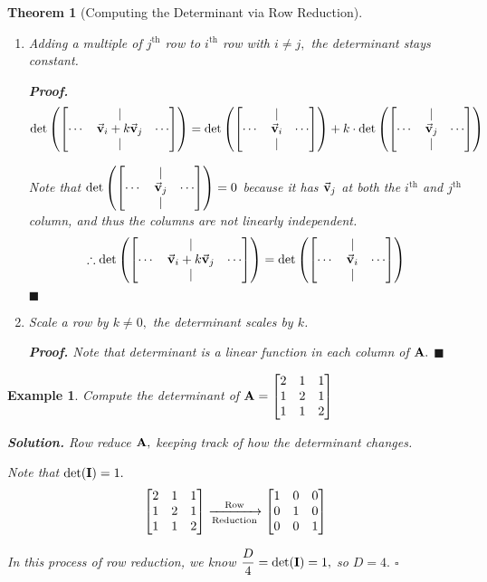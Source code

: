 \documentclass[12pt, a4paper]{article}
\newtheorem{thm}{Theorem}[subsection]
\newtheorem{eg}{Example}[subsection]
\newenvironment*{sol}{\par\indent\textbf{\textit{Solution. }}}{\hfill{$\square$}\par}
\newenvironment*{prf}{\par\indent\textbf{\textit{Proof. }}}{\hfill $\blacksquare$\par}
\def\vecv{\va{v}}
\def\matrixA{\vb{A}}
\def\matrixI{\vb{I}}
\begin{document}
\begin{thm}[Computing the Determinant via Row Reduction]
\begin{enumerate}
\begin{prf}
		\end{prf}
		\item Adding a multiple of $j^\text{th}$ row to $i^\text{th}$ row with $i\neq j,$ the determinant stays constant. 
		\begin{prf}
			\[\det\qty(\mqty[{&|&\\\cdots&\vecv_i+k\vecv_j&\cdots\\&|&}])=\det\qty(\mqty[{&|&\\\cdots&\vecv_i&\cdots\\&|&}])+k\cdot\det\qty(\mqty[{&|&\\\cdots&\vecv_j&\cdots\\&|&}])\]\par Note that $\det\qty(\mqty[{&|&\\\cdots&\vecv_j&\cdots\\&|&}])=0$ because it has $\vecv_j$ at both the $i^\text{th}$ and $j^\text{th}$ column, and thus the columns are not linearly independent. \[\therefore\det\qty(\mqty[{&|&\\\cdots&\vecv_i+k\vecv_j&\cdots\\&|&}])=\det\qty(\mqty[{&|&\\\cdots&\vecv_i&\cdots\\&|&}])\]
		\end{prf}
		\item Scale a row by $k\neq0,$ the determinant scales by $k$.
		\begin{prf}
			Note that determinant is a linear function in each column of $\matrixA.$
		\end{prf}
	\end{enumerate}
\end{thm}
\begin{eg}
	Compute the determinant of $\matrixA=\mqty[{2&1&1\\1&2&1\\1&1&2}]$
	\begin{sol}
		Row reduce $\matrixA,$ keeping track of how the determinant changes.\par  Note that $\det(\matrixI)=1.$	
		\[\mqty[{2&1&1\\1&2&1\\1&1&2}]\xrightarrow[\text{Reduction}]{\text{Row}}\mqty[{1&0&0\\0&1&0\\0&0&1}]\]\par In this process of row reduction, we know $\dfrac{D}{4}=\det(\matrixI)=1,$ so $D=4.$
	\end{sol}
\end{eg}
\end{document}
